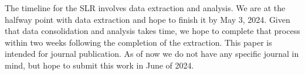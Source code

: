 The timeline for the SLR involves data extraction and analysis. We are at the halfway point with data extraction and hope to finish it by May 3, 2024. Given that data consolidation and analysis takes time, we hope to complete that process within two weeks following the completion of the extraction. This paper is intended for journal publication. As of now we do not have any specific journal in mind, but hope to submit this work in June of 2024. 












































